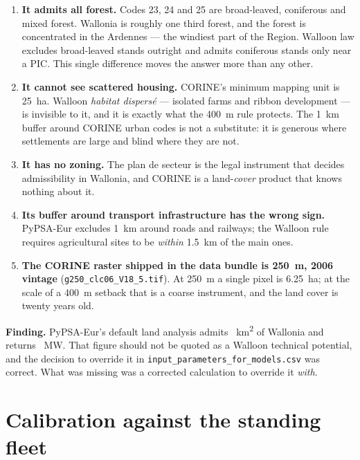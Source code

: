 \documentclass[11pt,a4paper]{article}
\newcommand{\finding}[1]{\par\medskip\noindent\colorbox{wal!10}{%
  \begin{minipage}{\dimexpr\linewidth-2\fboxsep}\textbf{Finding.} #1\end{minipage}}\par\medskip}
\begin{document}
\begin{enumerate}
  \item \textbf{It admits all forest.} Codes 23, 24 and 25 are broad-leaved,
    coniferous and mixed forest. Wallonia is roughly one third forest, and the
    forest is concentrated in the Ardennes --- the windiest part of the Region.
    Walloon law excludes broad-leaved stands outright and admits coniferous
    stands only near a PIC. This single difference moves the answer more than
    any other.
  \item \textbf{It cannot see scattered housing.} CORINE's minimum mapping unit
    is \SI{25}{\hectare}. Walloon \emph{habitat dispersé} --- isolated farms and
    ribbon development --- is invisible to it, and it is exactly what the
    \SI{400}{\metre} rule protects. The \SI{1}{\kilo\metre} buffer around CORINE
    urban codes is not a substitute: it is generous where settlements are large
    and blind where they are not.
  \item \textbf{It has no zoning.} The plan de secteur is the legal instrument
    that decides admissibility in Wallonia, and CORINE is a land-\emph{cover}
    product that knows nothing about it.
  \item \textbf{Its buffer around transport infrastructure has the wrong sign.}
    PyPSA-Eur excludes \SI{1}{\kilo\metre} around roads and railways; the
    Walloon rule requires agricultural sites to be \emph{within}
    \SI{1.5}{\kilo\metre} of the main ones.
  \item \textbf{The CORINE raster shipped in the data bundle is
    \SI{250}{\metre}, 2006 vintage} (\texttt{g250\_clc06\_V18\_5.tif}). At
    \SI{250}{\metre} a single pixel is \SI{6.25}{\hectare}; at the scale of a
    \SI{400}{\metre} setback that is a coarse instrument, and the land cover is
    twenty years old.
\end{enumerate}

\finding{PyPSA-Eur's default land analysis admits
\BaseEligible{}~\si{\square\kilo\metre} of Wallonia and returns
\BasePnom{}~MW. That figure should not be quoted as a Walloon technical
potential, and the decision to override it in
\texttt{input\_parameters\_for\_models.csv} was correct. What was missing was a
corrected calculation to override it \emph{with}.}

\section{Calibration against the standing fleet}\label{sec:calibration}
\end{document}
